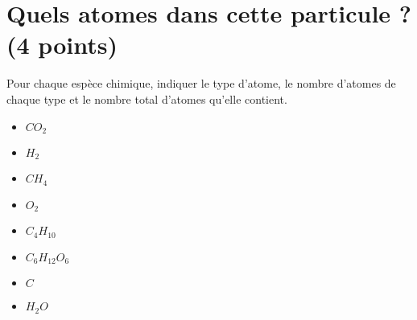 \section{Quels atomes dans cette particule ? (4 points)}\label{ex:particule}



\begin{questions}
	\question[4] Pour chaque espèce chimique, indiquer le type d'atome, le nombre d'atomes de chaque type et le nombre total d'atomes qu'elle contient.
	 
	\begin{multicols}{4}
		\begin{itemize}
			\item $CO_2$
			\item $H_2$
			\item $CH_4$
			\item $O_2$
			\item $C_4H_{10} $
			\item $C_6H_{12} O_6$
			\item $C$
			\item $H_2O$
		\end{itemize}
	\end{multicols}
	
\end{questions}